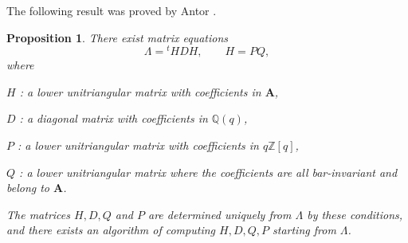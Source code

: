 \documentclass[12pt]{amsart}
\newcommand\vL{\varLambda}
\renewcommand{\1}{\mathbb 1}
\newcommand{\QQ}{\mathbb Q}
\newcommand{\ZZ}{\mathbb Z}
\newcommand\BA{\mathbf A}
\numberwithin{equation}{section}
\newtheorem{prop}[thm]{Proposition}
\begin{document}
The following result was proved by Antor \cite[Cor. 2.3]{A}.

\begin{prop}
There exist matrix equations
\begin{equation*}
\tag{1.10.1}  
\vL = {}^tHDH, \qquad H = PQ,
\end{equation*}
where
\par
$H$ : a lower unitriangular matrix with coefficients in $\BA$,

$D$ : a diagonal matrix with coefficients in $\QQ(q)$,

$P$ : a lower unitriangular matrix with coefficients in $q\ZZ[q]$, 

$Q$ : a lower unitriangular matrix where the coefficients are all
bar-invariant and belong to $\BA$.
\par\medskip
The matrices $H, D, Q$ and $P$ are determined uniquely from $\vL$ by these conditions,
and there exists an algorithm of computing $H, D, Q, P$ starting from $\vL$.  
\end{prop}  
\end{document}
